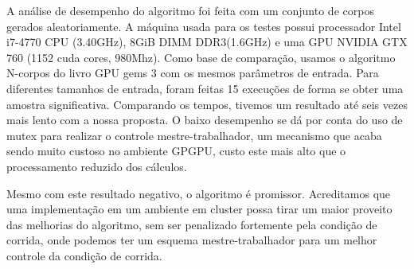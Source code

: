 \documentclass[12pt]{article}
\begin{document}
A análise de desempenho do algoritmo foi feita com um conjunto de
corpos gerados aleatoriamente. A máquina usada para os testes possui
processador Intel i7-4770 CPU (3.40GHz), 8GiB DIMM DDR3(1.6GHz) e uma
GPU NVIDIA GTX 760 (1152 cuda cores, 980Mhz). Como base de comparação,
usamos o algoritmo N-corpos do livro GPU gems 3 com os mesmos parâmetros
de entrada. Para diferentes tamanhos de entrada, foram feitas 15
execuções de forma se obter uma amostra significativa. Comparando os
tempos, tivemos um resultado até seis vezes mais lento com a nossa
proposta. O baixo desempenho se dá por conta do uso de mutex para
realizar o controle mestre-trabalhador, um mecanismo que acaba sendo
muito custoso no ambiente GPGPU, custo este mais alto que o
processamento reduzido dos cálculos.

Mesmo com este resultado negativo, o algoritmo é
promissor. Acreditamos que uma implementação em um ambiente em cluster
possa tirar um maior proveito das melhorias do algoritmo, sem ser
penalizado fortemente pela condição de corrida, onde podemos ter um
esquema mestre-trabalhador para um melhor controle da condição de
corrida.


\medskip
%
\end{document}

